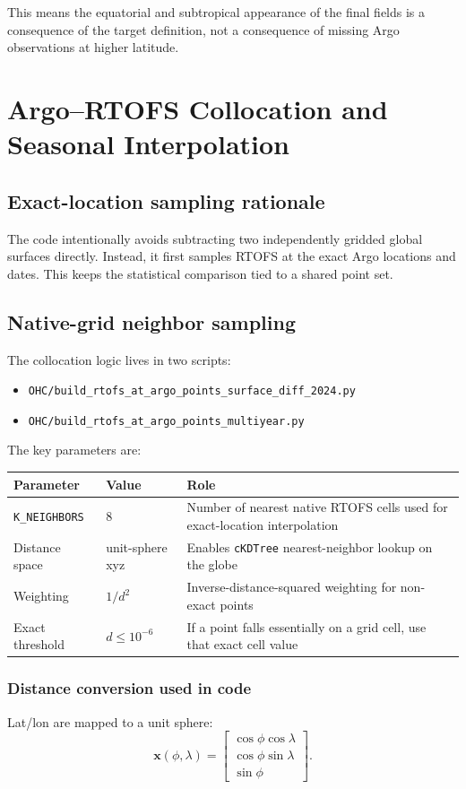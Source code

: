 \documentclass[11pt]{report}
\newcommand{\code}[1]{\texttt{#1}}
\begin{document}
This means the equatorial and subtropical appearance of the final fields is a consequence of the target definition, not a consequence of missing Argo observations at higher latitude.

\chapter{Argo--RTOFS Collocation and Seasonal Interpolation}
\section{Exact-location sampling rationale}
The code intentionally avoids subtracting two independently gridded global surfaces directly. Instead, it first samples RTOFS at the exact Argo locations and dates. This keeps the statistical comparison tied to a shared point set.

\section{Native-grid neighbor sampling}
The collocation logic lives in two scripts:
\begin{itemize}[leftmargin=1.3em]
  \item \code{OHC/build\_rtofs\_at\_argo\_points\_surface\_diff\_2024.py}
  \item \code{OHC/build\_rtofs\_at\_argo\_points\_multiyear.py}
\end{itemize}
The key parameters are:
\begin{table}[H]
\centering
\small
\begin{tabular}{P{0.18\textwidth} P{0.15\textwidth} P{0.55\textwidth}}
\toprule
\textbf{Parameter} & \textbf{Value} & \textbf{Role} \\
\midrule
\code{K\_NEIGHBORS} & 8 & Number of nearest native RTOFS cells used for exact-location interpolation \\
Distance space & unit-sphere xyz & Enables \code{cKDTree} nearest-neighbor lookup on the globe \\
Weighting & $1/d^2$ & Inverse-distance-squared weighting for non-exact points \\
Exact threshold & $d \le 10^{-6}$ & If a point falls essentially on a grid cell, use that exact cell value \\
\bottomrule
\end{tabular}
\normalsize
\end{table}

\subsection{Distance conversion used in code}
Lat/lon are mapped to a unit sphere:
\begin{equation}
\mathbf{x}(\phi,\lambda) = 
\begin{bmatrix}
\cos\phi\cos\lambda \\
\cos\phi\sin\lambda \\
\sin\phi
\end{bmatrix}.
\end{equation}
\end{document}
